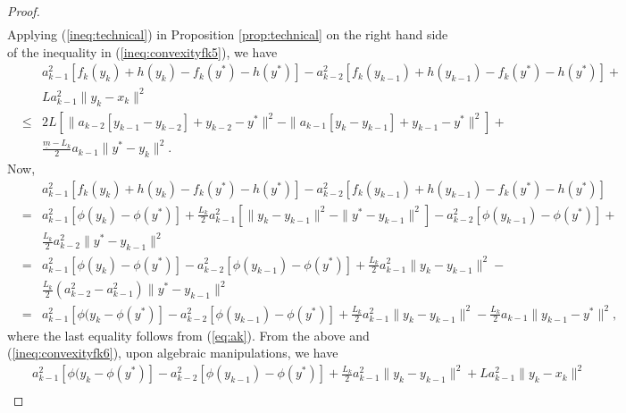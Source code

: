 \documentclass[11pt]{article}
\begin{document}
\begin{proof}
\begin{eqnarray}
\end{eqnarray}
Applying (\ref{ineq:technical}) in Proposition \ref{prop:technical} on the right hand side of the inequality in (\ref{ineq:convexityfk5}), we have
\begin{eqnarray}
& & a_{k-1}^2[f_{k}(y_{k}) + h(y_{k}) - f_{k}(y^\ast) - h(y^\ast)] - a_{k-2}^2[f_{k}(y_{k-1}) + h(y_{k-1}) - f_{k}(y^\ast) - h(y^\ast)] + \nonumber \\
& & La_{k-1}^2 \| y_{k} - {x}_{k} \|^2  \nonumber \\
& \leq &   2 L [\|a_{k-2}[ y_{k-1} - y_{k-2}]  + y_{k-2} - y^\ast \|^2 - \| a_{k-1}[ y_{k} - y_{k-1}]  + y_{k-1} - y^\ast \|^2] + \nonumber \\
&   & \frac{\underline{m} - L_k}{2} a_{k-1} \| y^\ast - y_{k} \|^2. \label{ineq:convexityfk6}
\end{eqnarray}
Now,
\begin{eqnarray*}
& & a_{k-1}^2[f_{k}(y_{k}) + h(y_{k}) - f_{k}(y^\ast) - h(y^\ast)] - a_{k-2}^2[f_{k}(y_{k-1}) + h(y_{k-1}) - f_{k}(y^\ast) - h(y^\ast)] \nonumber \\
& = & a_{k-1}^2[\phi(y_{k}) - \phi(y^\ast)]  + \frac{L_k}{2}a_{k-1}^2[\|y_{k} - y_{k-1} \|^2 - \| y^\ast - y_{k-1} \|^2]  - a_{k-2}^2[\phi(y_{k-1}) - \phi(y^\ast)] + \\
& & \frac{L_k}{2}a_{k-2}^2  \| y^\ast - y_{k-1} \|^2 \\
& = & a_{k-1}^2[\phi(y_{k}) - \phi(y^\ast)] - a_{k-2}^2 [\phi(y_{k-1}) - \phi(y^\ast)] + \frac{L_k}{2}a_{k-1}^2 \|y_{k} - y_{k-1} \|^2 - \\
&  & \frac{L_k}{2}( a_{k-2}^2 - a_{k-1}^2) \| y^\ast - y_{k-1} \|^2 \\
& = & a_{k-1}^2[\phi(y_{k} - \phi(y^\ast)] - a_{k-2}^2 [\phi(y_{k-1}) - \phi(y^\ast)] + \frac{L_k}{2}a_{k-1}^2  \|y_{k} - y_{k-1} \|^2 -  \frac{L_k}{2} a_{k-1} \| y_{k-1} - y^\ast \|^2,
\end{eqnarray*}
where the last equality follows from (\ref{eq:ak}).   From the above and (\ref{ineq:convexityfk6}), upon algebraic manipulations, we have
\begin{eqnarray*}
& & a_{k-1}^2[\phi(y_{k} - \phi(y^\ast)] - a_{k-2}^2 [\phi(y_{k-1}) - \phi(y^\ast)] + \frac{L_k}{2} a_{k-1}^2 \|y_{k} - y_{k-1} \|^2 +  La_{k-1}^2 \| y_{k} - {x}_{k} \|^2 \\

\end{eqnarray*}
\end{proof}
\end{document}
